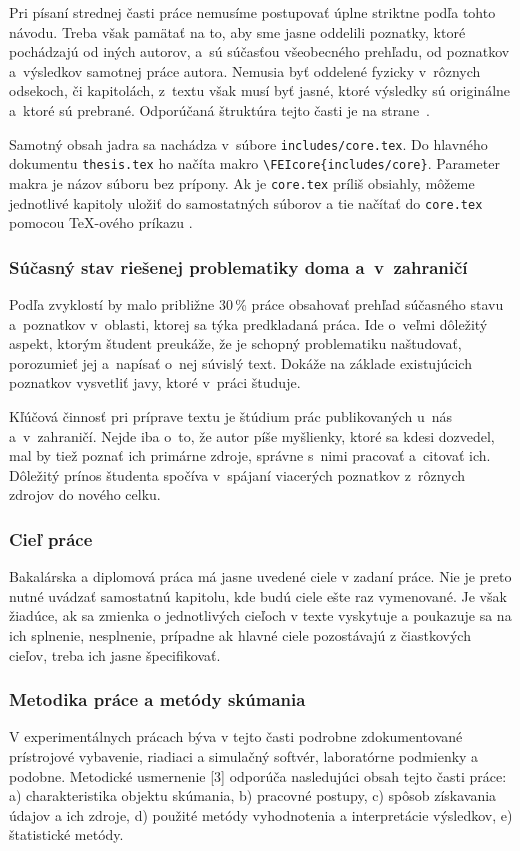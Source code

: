 Pri písaní strednej časti práce nemusíme postupovať úplne
striktne podľa tohto návodu.
Treba však pamätať na to,
aby sme jasne oddelili poznatky,
ktoré pochádzajú od iných autorov,
a~sú súčasťou všeobecného prehľadu,
od poznatkov a~výsledkov samotnej práce autora.
Nemusia byť oddelené fyzicky v~rôznych odsekoch,
či kapitolách, z~textu však musí byť jasné,
ktoré výsledky sú originálne a~ktoré sú prebrané.
Odporúčaná štruktúra tejto časti je na
strane~\pageref{sec:StrukturaPrace}.

Samotný obsah jadra sa nachádza v~súbore \verb|includes/core.tex|.
Do hlavného dokumentu \verb|thesis.tex| ho načíta makro \verb|\FEIcore{includes/core}|.
Parameter makra je názov súboru bez prípony.
Ak je \verb|core.tex| príliš obsiahly,
môžeme jednotlivé kapitoly uložiť do samostatných
súborov a tie načítať do \verb|core.tex|
pomocou \TeX-ového príkazu \verb||.

\subsubsection*{\normalsize Súčasný stav riešenej problematiky
doma a~v~zahraničí}
Podľa zvyklostí by malo približne 30\,\% práce obsahovať prehľad
súčasného stavu a~poznatkov v~oblasti,
ktorej sa týka predkladaná práca.
Ide o~veľmi dôležitý aspekt,
ktorým študent preukáže,
že je schopný problematiku naštudovať,
porozumieť jej a~napísať o~nej súvislý text.
Dokáže na základe existujúcich poznatkov vysvetliť javy,
ktoré v~práci študuje.

Kľúčová činnosť pri príprave textu je štúdium prác publikovaných
u~nás a~v~zahraničí.
Nejde iba o~to, že autor píše myšlienky, ktoré sa kdesi dozvedel,
mal by tiež poznať ich primárne zdroje,
správne s~nimi pracovať a~citovať ich.
Dôležitý prínos študenta spočíva v~spájaní viacerých poznatkov
z~rôznych zdrojov do nového celku.

\subsubsection*{\normalsize Cieľ práce}
Bakalárska a diplomová práca má jasne uvedené ciele v zadaní práce. Nie je preto nutné uvádzať samostatnú kapitolu, kde budú ciele ešte raz vymenované. Je však žiadúce, ak sa zmienka o jednotlivých cieľoch v texte vyskytuje a poukazuje sa na ich splnenie, nesplnenie, prípadne ak hlavné ciele pozostávajú z čiastkových cieľov, treba ich jasne špecifikovať.

\subsubsection*{\normalsize Metodika práce a metódy skúmania}
V experimentálnych prácach býva v tejto časti podrobne zdokumentované prístrojové vybavenie, riadiaci a simulačný softvér, laboratórne podmienky a podobne. Metodické usmernenie [3] odporúča nasledujúci obsah tejto časti práce: a) charakteristika objektu skúmania, b) pracovné postupy, c) spôsob získavania údajov a ich zdroje, d) použité metódy vyhodnotenia a interpretácie výsledkov, e) štatistické metódy.

